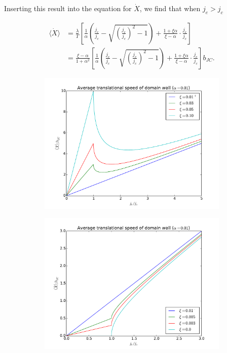 \documentclass[1p]{elsarticle}		%
\numberwithin{equation}{section}
\begin{document}
Inserting this result into the equation for $\dot{X}$, we find that when $j_e > j_c$

\begin{align}
\label{eq:xdot_av_abovecrit}
\nonumber \langle\dot{X}\rangle &= \frac{\lambda}{T}\left[\frac{1}{\alpha}(\frac{j_e}{j_c}-\sqrt{(\frac{j_e}{j_c})^2-1}) + \frac{1+\xi\alpha}{\xi-\alpha}\cdot\frac{j_e}{j_c}\right] \\
&= \frac{\xi-\alpha}{1+\alpha^2} \left[\frac{1}{\alpha}(\frac{j_e}{j_c}-\sqrt{(\frac{j_e}{j_c})^2-1}) + \frac{1+\xi\alpha}{\xi-\alpha}\cdot\frac{j_e}{j_c}\right] b_{JC}.
\end{align}

\begin{figure}[h!]
\centering
\begin{subfigure}{.5\textwidth}
  \centering
  \includegraphics[width=1.0\linewidth]{Figures/walkerBreakdown}
  \caption{}
  \label{fig:walkerBreakdown}
\end{subfigure}%
\begin{subfigure}{.5\textwidth}
  \centering
  \includegraphics[width=1.0\linewidth]{Figures/criticalCurrentXdot}

\end{subfigure}
\end{figure}
\end{document}
